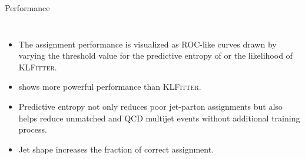 \begin{frame}[fragile]{Performance}
  \begin{columns}
      \begin{itemize}
        \item
            The assignment performance is visualized as ROC-like curves drawn by
            varying the threshold value for the predictive entropy of \saja or
            the likelihood of \textsc{KLFitter}.
        \item
            \saja shows more powerful performance than \textsc{KLFitter}.
        \item
            Predictive entropy not only reduces poor jet-parton assignments but
            also helps reduce unmatched \ttbar and QCD multijet events without
            additional training process.
        \item
            Jet shape increases the fraction of correct assignment.
      \end{itemize} 
      

\end{columns}
\end{frame}
